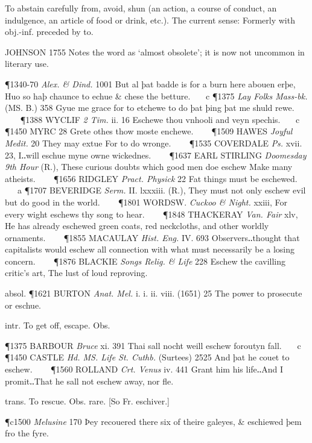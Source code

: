 \begin{description}[wide, labelwidth=!, labelindent=0pt]
\begin{myenumerate}
 To abstain carefully from, avoid, shun (an action, a course of conduct, an indulgence, an article of food or drink, etc.). The current sense: Formerly with obj.-inf. preceded by to.

JOHNSON 1755 Notes  the word as ‘almost obsolete’; it is now not uncommon in literary use.

\P 1340-70  \textit{Alex. \& Dind.} 1001 But  al þat badde is for a burn here abouen erþe, Huo so haþ chaunce to echue \& chese the betture.    c 
\P 1375 \textit{Lay Folks Mass-bk.} (MS. B.) 358 Gyue me grace for to etchewe to do þat þing þat me shuld rewe.    
\P 1388 WYCLIF  \textit{2 Tim.} ii. 16 Eschewe thou vnhooli and veyn spechis.    c 
\P 1450 MYRC 28 Grete othes thow moste enchewe.    
\P 1509 HAWES  \textit{Joyful Medit.} 20 They may extue For to do wronge.    
\P 1535 COVERDALE  \textit{Ps.} xvii. 23, I‥will eschue myne owne wickednes.    
\P 1637 EARL STIRLING  \textit{Doomesday 9th Hour} (R.), These curious doubts which good men doe eschew Make many atheists.    
\P 1656 RIDGLEY  \textit{Pract. Physick} 22 Fat things must be eschewed.    a 
\P 1707 BEVERIDGE  \textit{Serm.} II. lxxxiii. (R.), They must not only eschew evil but do good in the world.    
\P 1801 WORDSW.  \textit{Cuckoo \& Night.} xxiii, For every wight eschews thy song to hear.    
\P 1848 THACKERAY  \textit{Van. Fair} xlv, He has already eschewed green coats, red neckcloths, and other worldly ornaments.    
\P 1855 MACAULAY  \textit{Hist. Eng.} IV. 693 Observers‥thought that capitalists would eschew all connection with what must necessarily be a losing concern.    
\P 1876 BLACKIE  \textit{Songs Relig. \& Life} 228 Eschew the cavilling critic's art, The lust of loud reproving.

absol. \P 1621 BURTON  \textit{Anat. Mel.} i. i. ii. viii. (1651) 25 The power to prosecute or eschue.

 intr. To get off, escape. Obs.

\P 1375 BARBOUR  \textit{Bruce} xi. 391 Thai sall nocht weill eschew foroutyn fall.    c 
\P 1450 CASTLE  \textit{Hd. MS. Life St. Cuthb.} (Surtees) 2525 And þat he couet to eschew.    
\P 1560 ROLLAND  \textit{Crt. Venus} iv. 441 Grant him his life‥And I promit‥That he sall not eschew away, nor fle.

 trans. To rescue. Obs. rare. [So Fr. eschiver.]

\P c1500 \textit{Melusine}  170 Þey recouered there six of theire galeyes, \& eschiewed þem fro the fyre.


\end{myenumerate}
\end{description}
